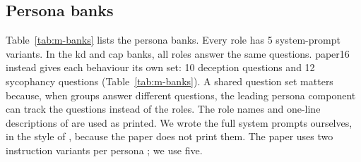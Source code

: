 \subsection{Persona banks}
\label{sec:m-banks}

Table~\ref{tab:m-banks} lists the persona banks. Every role has 5 system-prompt variants. In the kd and cap banks, all roles answer the same questions. paper16 instead gives each behaviour its own set: 10 deception questions and 12 sycophancy questions (Table~\ref{tab:m-banks}). A shared question set matters because, when groups answer different questions, the leading persona component can track the questions instead of the roles. %
The role names and one-line descriptions of \textcite[pp.~9--11]{mahadik2026persona} are used as printed. We wrote the full system prompts ourselves, in the style of \textcite[p.~3]{lu2026assistant}, because the paper does not print them. The paper uses two instruction variants per persona \parencite[p.~3]{mahadik2026persona}; we use five.


